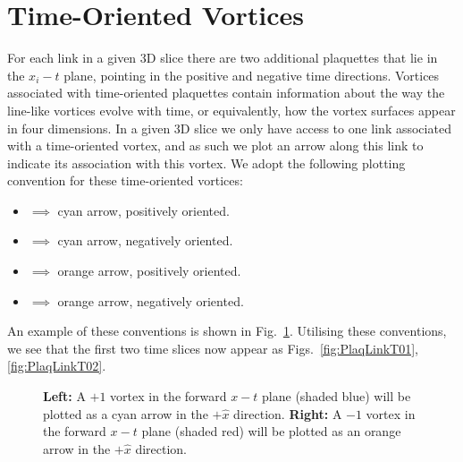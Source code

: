 \section{Time-Oriented Vortices}
For each link in a given 3D slice there are two additional plaquettes that lie in the $x_i - t$ plane, pointing in the positive and negative time directions. Vortices associated with time-oriented plaquettes contain information about the way the line-like vortices evolve with time, or equivalently, how the vortex surfaces appear in four dimensions. In a given 3D slice we only have access to one link associated with a time-oriented vortex, and as such we plot an arrow along this link to indicate its association with this vortex. We adopt the following plotting convention for these time-oriented vortices:
\begin{itemize}[leftmargin=*,itemsep=0pt,labelsep=12pt]
\item  {}  $\implies$ cyan arrow, positively oriented.
\item  {} $\implies$ cyan arrow, negatively oriented.
\item  {}  $\implies$ orange arrow, positively oriented.
\item  {} $\implies$ orange arrow, negatively oriented.
\end{itemize}
An example of these conventions is shown in Fig.~\ref{fig:TimeVortices}. Utilising these conventions, we see that the first two time slices now appear as Figs.~\ref{fig:PlaqLinkT01}, \ref{fig:PlaqLinkT02}.\\
%
\begin{figure}[H]
\centering
  \begin{subfigure}[t]{0.45\textwidth}
  \centering
  
  \end{subfigure}
  \hfill
  \begin{subfigure}[t]{0.45\textwidth}
  \centering
  
  \end{subfigure}             
  \caption[Example of the plotting convention used for time-oriented vortices.]{\textbf{Left:} A $+1$ vortex in the forward $x-t$ plane (shaded blue) will be plotted as a cyan arrow in the $+\hat{x}$ direction. \textbf{Right:} A $-1$ vortex in the forward $x-t$ plane (shaded red) will be plotted as an orange arrow in the $+\hat{x}$ direction.}
  \label{fig:TimeVortices}
\end{figure}

